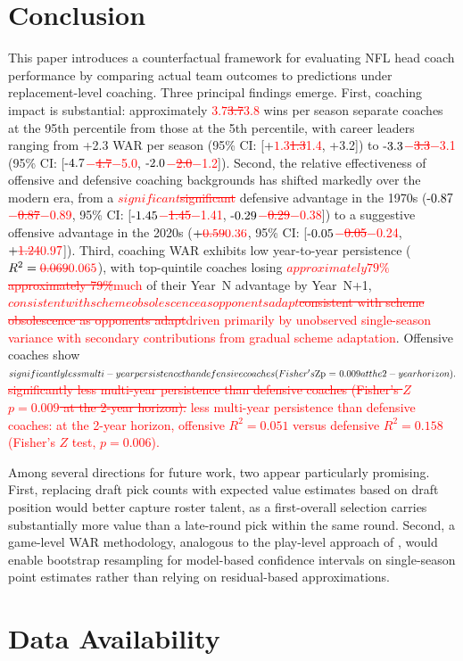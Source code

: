 \documentclass[USenglish]{article}
\newcommand{\rev}[1]{\textcolor{red}{#1}}
\newcommand{\del}[1]{\textcolor{red}{\ifmmode\mbox{\sout{\ensuremath{#1}}}\else\sout{#1}\fi}}
\theoremstyle{dgthm}
\theoremstyle{dgdef}
\begin{document}
\section{Conclusion}

This paper introduces a counterfactual framework for evaluating NFL head coach performance by comparing actual team outcomes to predictions under replacement-level coaching. Three principal findings emerge. First, coaching impact is substantial: approximately \del{3.7}\rev{3.8} wins per season separate coaches at the 95th percentile from those at the 5th percentile, with career leaders ranging from +2.3 WAR per season (95\% CI: [+\del{1.3}\rev{1.4}, +3.2]) to \del{$-$3.3}\rev{$-$3.1} (95\% CI: [\del{$-$4.7}\rev{$-$5.0}, \del{$-$2.0}\rev{$-$1.2}]). Second, the relative effectiveness of offensive and defensive coaching backgrounds has shifted markedly over the modern era, from a \del{significant }defensive advantage in the 1970s (\del{$-$0.87}\rev{$-$0.89}, 95\% CI: [\del{$-$1.45}\rev{$-$1.41}, \del{$-$0.29}\rev{$-$0.38}]) to a suggestive offensive advantage in the 2020s ($+\del{0.59}\rev{0.36}$, 95\% CI: [\del{$-$0.05}\rev{$-$0.24}, $+\del{1.24}\rev{0.97}$]). Third, coaching WAR exhibits low year-to-year persistence ($R^2 = \del{0.069}\rev{0.065}$), with top-quintile coaches losing \del{approximately 79\%}\rev{much} of their Year~N advantage by Year~N+1, \del{consistent with scheme obsolescence as opponents adapt}\rev{driven primarily by unobserved single-season variance with secondary contributions from gradual scheme adaptation}. Offensive coaches show \del{significantly less multi-year persistence than defensive coaches (Fisher's $Z$ $p = 0.009$ at the 2-year horizon).} \rev{less multi-year persistence than defensive coaches: at the 2-year horizon, offensive $R^2 = 0.051$ versus defensive $R^2 = 0.158$ (Fisher's $Z$ test, $p = 0.006$).}

Among several directions for future work, two appear particularly promising. First, replacing draft pick counts with expected value estimates based on draft position would better capture roster talent, as a first-overall selection carries substantially more value than a late-round pick within the same round. Second, a game-level WAR methodology, analogous to the play-level approach of \citet{yurko2019}, would enable bootstrap resampling for model-based confidence intervals on single-season point estimates rather than relying on residual-based approximations.

\section*{Data Availability}
\end{document}
